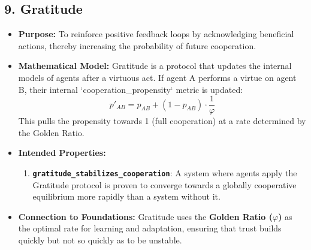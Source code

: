 \documentclass[11pt,a4paper]{article}
\begin{document}
\begin{itemize}
\subsection{9. Gratitude}
\begin{itemize}
    \item \textbf{Purpose:} To reinforce positive feedback loops by acknowledging beneficial actions, thereby increasing the probability of future cooperation.
    \item \textbf{Mathematical Model:} Gratitude is a protocol that updates the internal models of agents after a virtuous act. If agent A performs a virtue on agent B, their internal `cooperation_propensity` metric is updated:
        \[ p'_{AB} = p_{AB} + (1 - p_{AB}) \cdot \frac{1}{\varphi} \]
        This pulls the propensity towards 1 (full cooperation) at a rate determined by the Golden Ratio.
    \item \textbf{Intended Properties:}
        \begin{enumerate}
            \item \textbf{\texttt{gratitude\_stabilizes\_cooperation}}: A system where agents apply the Gratitude protocol is proven to converge towards a globally cooperative equilibrium more rapidly than a system without it.
        \end{enumerate}
    \item \textbf{Connection to Foundations:} Gratitude uses the \textbf{Golden Ratio ($\varphi$)} as the optimal rate for learning and adaptation, ensuring that trust builds quickly but not so quickly as to be unstable.
\end{itemize}


\end{itemize}
\end{document}
